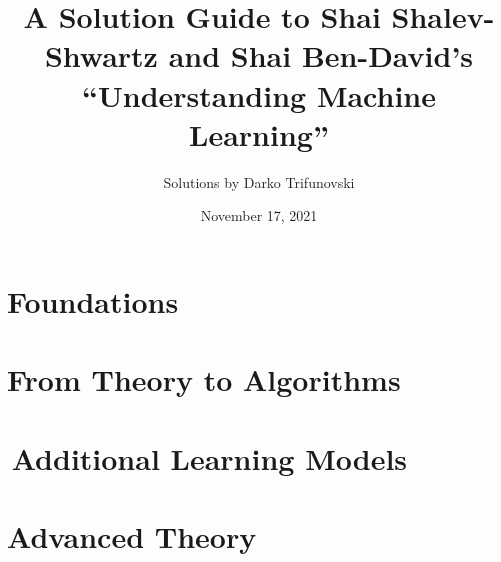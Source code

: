 \documentclass[oneside]{memoir}
\title{A Solution Guide to Shai Shalev-Shwartz and Shai Ben-David's\\ ``Understanding Machine Learning''}
\author{Solutions by Darko Trifunovski}
\date{November 17, 2021}
\theoremstyle{definition}
\begin{document}
\frontmatter
\begin{titlingpage}
  \maketitle
\end{titlingpage}
\tableofcontents

\mainmatter
\setcounter{chapter}{1}
\part{Foundations}








\part{From Theory to Algorithms}













\part{\,Additional Learning Models}






\part{Advanced Theory}
\setcounter{chapter}{28}

\setcounter{chapter}{30}

\end{document}
